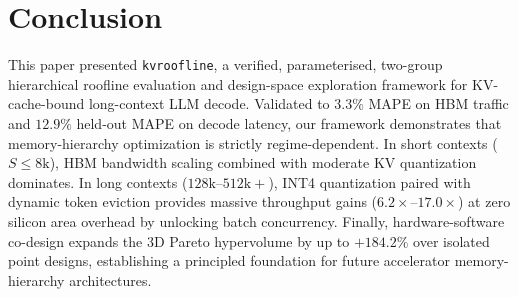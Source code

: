\documentclass[conference,onecolumn]{IEEEtran}
\begin{document}
\section{Conclusion}
This paper presented \texttt{kvroofline}, a verified, parameterised, two-group hierarchical roofline evaluation and design-space exploration framework for KV-cache-bound long-context LLM decode. Validated to $3.3\%$ MAPE on HBM traffic and $12.9\%$ held-out MAPE on decode latency, our framework demonstrates that memory-hierarchy optimization is strictly regime-dependent. In short contexts ($S \le 8\text{k}$), HBM bandwidth scaling combined with moderate KV quantization dominates. In long contexts ($128\text{k}$--$512\text{k}+$), INT4 quantization paired with dynamic token eviction provides massive throughput gains ($6.2\times$--$17.0\times$) at zero silicon area overhead by unlocking batch concurrency. Finally, hardware-software co-design expands the 3D Pareto hypervolume by up to $+184.2\%$ over isolated point designs, establishing a principled foundation for future accelerator memory-hierarchy architectures.



\end{document}
